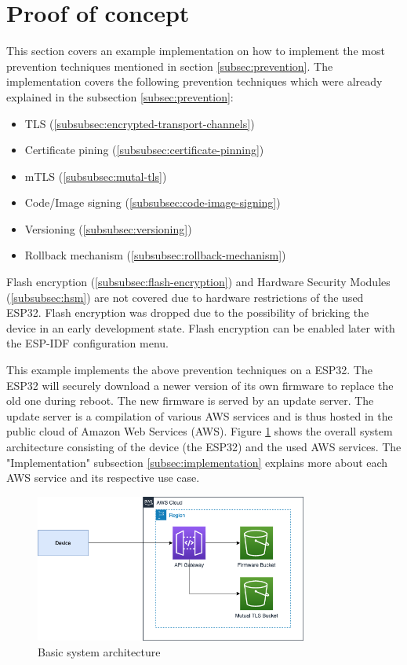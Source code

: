 \section{Proof of concept}\label{sec:proof-of-concept}
This section covers an example implementation on how to implement the most prevention techniques mentioned in section \ref{subsec:prevention}. The implementation covers the following prevention techniques which were already explained in the subsection \ref{subsec:prevention}:

\bigskip
\begin{itemize}
    \item TLS (\ref{subsubsec:encrypted-transport-channels})
    \item Certificate pining (\ref{subsubsec:certificate-pinning})
    \item mTLS (\ref{subsubsec:mutal-tls})
    \item Code/Image signing (\ref{subsubsec:code-image-signing})
    \item Versioning (\ref{subsubsec:versioning})
    \item Rollback mechanism (\ref{subsubsec:rollback-mechanism})
\end{itemize}
\bigskip

Flash encryption (\ref{subsubsec:flash-encryption}) and Hardware Security Modules (\ref{subsubsec:hsm}) are not covered due to hardware restrictions of the used ESP32. Flash encryption was dropped due to the possibility of bricking the device in an early development state. Flash encryption can be enabled later with the ESP-IDF configuration menu.

\bigskip
This example implements the above prevention techniques on a ESP32. The ESP32 will securely download a newer version of its own firmware to replace the old one during reboot. The new firmware is served by an update server. The update server is a compilation of various AWS services and is thus hosted in the public cloud of Amazon Web Services (AWS). Figure \ref{fig:poc-architecture} shows the overall system architecture consisting of the device (the ESP32) and the used AWS services. The "Implementation" subsection \ref{subsec:implementation} explains more about each AWS service and its respective use case.

\bigskip
\begin{figure}[H]
    \centering
    \includegraphics[width=0.8\textwidth]{proof-of-concept/assets/architecture.drawio.png}
    \caption{Basic system architecture}\label{fig:poc-architecture}
\end{figure}

\newpage


